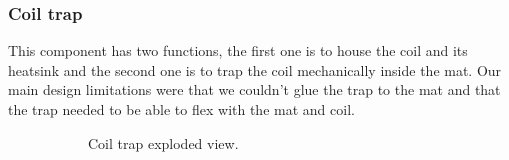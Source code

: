\subsubsection{Coil trap}
This component has two functions, the first one is to house the coil and its heatsink and the second one is to trap the coil mechanically inside the mat.
Our main design limitations were that we couldn't glue the trap to the mat and that the trap needed to be able to flex with the mat and coil.
\begin{figure}
    \centering
    \begin{subfigure}[b]{0.475\textwidth}
        \centering
        \caption{Coil trap exploded view.}
        \label{fig: coil_trap_expl}
    \end{subfigure}
    \hfill
    \begin{subfigure}[b]{0.475\textwidth}
        \centering
        \resizebox{\textwidth}{!}{
}
\end{subfigure}
\end{figure}
